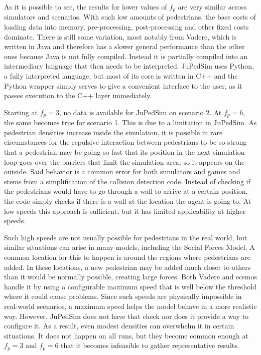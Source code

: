 \documentclass[twoside, 11pt]{article}
\begin{document}
As it is possible to see, the results for lower values of $f_p$ are very similar across simulators and scenarios. With such low amounts of pedestrians, the base costs of loading data into memory, pre-processing, post-processing and other fixed costs dominate. There is still some variation, most notably from Vadere, which is written in Java and therefore has a slower general performance than the other ones because Java is not fully compiled. Instead it is partially compiled into an intermediary language that then needs to be interpreted. JuPedSim uses Python, a fully interpreted language, but most of its core is written in C++ and the Python wrapper simply serves to give a convenient interface to the user, as it passes execution to the C++ layer immediately.

Starting at $f_p = 3$, no data is available for JuPedSim on scenario 2. At $f_p = 6$, the same becomes true for scenario 1. This is due to a limitation in JuPedSim. As pedestrian densities increase inside the simulation, it is possible in rare circumstances for the repulsive interaction between pedestrians to be so strong that a pedestrian may be going so fast that its position in the next simulation loop goes over the barriers that limit the simulation area, so it appears on the outside. Said behavior is a common error for both simulators and games and stems from a simplification of the collision detection code. Instead of checking if the pedestrians would have to go through a wall to arrive at a certain position, the code simply checks if there is a wall at the location the agent is going to. At low speeds this approach is sufficient, but it has limited applicability at higher speeds.

Such high speeds are not usually possible for pedestrians in the real world, but similar situations can arise in many models, including the Social Forces Model. A common location for this to happen is around the regions where pedestrians are added. In these locations, a new pedestrian may be added much closer to others than it would be normally possible, creating large forces. Both Vadere and \gls{ecsmos} handle it by using a configurable maximum speed that is well below the threshold where it could cause problems. Since such speeds are physically impossible in real-world scenarios, a maximum speed helps the model behave in a more realistic way. However, JuPedSim does not have that check nor does it provide a way to configure it. As a result, even modest densities can overwhelm it in certain situations. It does not happen on all runs, but they become common enough at $f_p = 3$ and $f_p = 6$ that it becomes infeasible to gather representative results.
\end{document}
